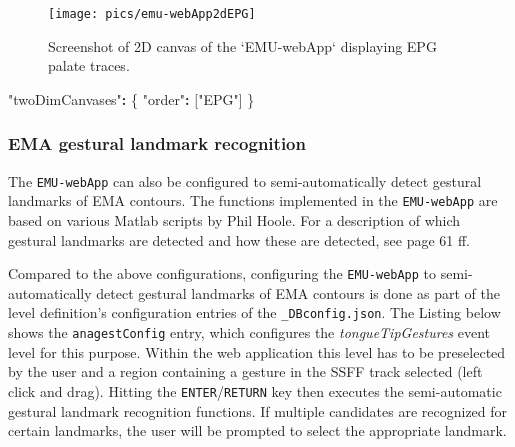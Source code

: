 \documentclass[
]{book}
\newenvironment{Shaded}{\begin{snugshade}}{\end{snugshade}}
\newcommand{\NormalTok}[1]{#1}
\newcommand{\OperatorTok}[1]{\textcolor[rgb]{0.81,0.36,0.00}{\textbf{#1}}}
\newcommand{\StringTok}[1]{\textcolor[rgb]{0.31,0.60,0.02}{#1}}
\begin{document}
\begin{figure}

{\centering \texttt{[image: pics/emu-webApp2dEPG]} 

}

\caption{Screenshot of 2D canvas of the `EMU-webApp` displaying EPG palate traces.}\label{fig:webApp-2dEPG}
\end{figure}

\begin{Shaded}
\begin{Highlighting}[]
\StringTok{"twoDimCanvases"}\OperatorTok{:}\NormalTok{ \{}
    \StringTok{"order"}\OperatorTok{:}\NormalTok{ [}\StringTok{"EPG"}\NormalTok{]}
\NormalTok{\}}
\end{Highlighting}
\end{Shaded}

\hypertarget{ema-gestural-landmark-recognition}{%
\subsubsection*{EMA gestural landmark recognition}\label{ema-gestural-landmark-recognition}}

The \texttt{EMU-webApp} can also be configured to semi-automatically detect gestural landmarks of EMA contours. The functions implemented in the \texttt{EMU-webApp} are based on various Matlab scripts by Phil Hoole. For a description of which gestural landmarks are detected and how these are detected, see \citet{bombien:2011aa} page 61 ff.

Compared to the above configurations, configuring the \texttt{EMU-webApp} to semi-automatically detect gestural landmarks of EMA contours is done as part of the level definition's configuration entries of the \texttt{\_DBconfig.json}. The Listing below shows the \texttt{anagestConfig} entry, which configures the \emph{tongueTipGestures} event level for this purpose. Within the web application this level has to be preselected by the user and a region containing a gesture in the SSFF track selected (left click and drag). Hitting the \texttt{ENTER}/\texttt{RETURN} key then executes the semi-automatic gestural landmark recognition functions. If multiple candidates are recognized for certain landmarks, the user will be prompted to select the appropriate landmark.
\end{document}
